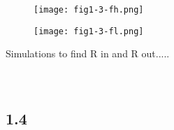   \begin{figure}[h!]
        \centering
        \texttt{[image: fig1-3-fh.png]}
  \end{figure}

  \begin{figure}[h!]
        \centering
        \texttt{[image: fig1-3-fl.png]}
  \end{figure}

  Simulations to find R in and R out.....\\\\\\




\subsection*{1.4}
  